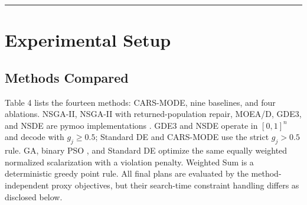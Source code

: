 \documentclass[energies,article,submit,moreauthors]{Definitions/mdpi}
\begin{document}
\begin{center}\rule{0.5\linewidth}{0.5pt}\end{center}

\section{Experimental Setup}\label{experimental-setup}

\subsection{Methods Compared}\label{methods-compared}

Table 4 lists the fourteen methods: CARS-MODE, nine baselines, and four ablations. NSGA-II, NSGA-II with returned-population repair, MOEA/D, GDE3, and NSDE are pymoo implementations \cite{ref6}. GDE3 and NSDE operate in \([0,1]^n\) and decode with \(g_j\geq0.5\); Standard DE and CARS-MODE use the strict \(g_j>0.5\) rule. GA, binary PSO \cite{ref31}, and Standard DE optimize the same equally weighted normalized scalarization with a violation penalty. Weighted Sum is a deterministic greedy point rule. All final plans are evaluated by the method-independent proxy objectives, but their search-time constraint handling differs as disclosed below.
\end{document}
